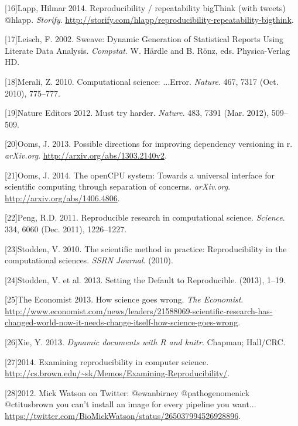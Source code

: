 \documentclass[9pt]{components/acm_proc_article-sp}
\begin{document}
{[}16{]}Lapp, Hilmar 2014. Reproducibility / repeatability bigThink
(with tweets) @hlapp. \emph{Storify}.
\url{http://storify.com/hlapp/reproducibility-repeatability-bigthink}.

{[}17{]}Leisch, F. 2002. Sweave: Dynamic Generation of Statistical
Reports Using Literate Data Analysis. \emph{Compstat}. W. Härdle and B.
Rönz, eds. Physica-Verlag HD.

{[}18{]}Merali, Z. 2010. Computational science: ...Error. \emph{Nature}.
467, 7317 (Oct. 2010), 775--777.

{[}19{]}Nature Editors 2012. Must try harder. \emph{Nature}. 483, 7391
(Mar. 2012), 509--509.

{[}20{]}Ooms, J. 2013. Possible directions for improving dependency
versioning in r. \emph{arXiv.org}.
\url{http://arxiv.org/abs/1303.2140v2}.

{[}21{]}Ooms, J. 2014. The openCPU system: Towards a universal interface
for scientific computing through separation of concerns.
\emph{arXiv.org}. \url{http://arxiv.org/abs/1406.4806}.

{[}22{]}Peng, R.D. 2011. Reproducible research in computational science.
\emph{Science}. 334, 6060 (Dec. 2011), 1226--1227.

{[}23{]}Stodden, V. 2010. The scientific method in practice:
Reproducibility in the computational sciences. \emph{SSRN Journal}.
(2010).

{[}24{]}Stodden, V. et al. 2013. Setting the Default to Reproducible.
(2013), 1--19.

{[}25{]}The Economist 2013. How science goes wrong. \emph{The
Economist}.
\url{http://www.economist.com/news/leaders/21588069-scientific-research-has-changed-world-now-it-needs-change-itself-how-science-goes-wrong}.

{[}26{]}Xie, Y. 2013. \emph{Dynamic documents with R and knitr}.
Chapman; Hall/CRC.

{[}27{]}2014. Examining reproducibility in computer science.
\url{http://cs.brown.edu/~sk/Memos/Examining-Reproducibility/}.

{[}28{]}2012. Mick Watson on Twitter: @ewanbirney @pathogenomenick
@ctitusbrown you can't install an image for every pipeline you want...
\url{https://twitter.com/BioMickWatson/status/265037994526928896}.
\end{document}

